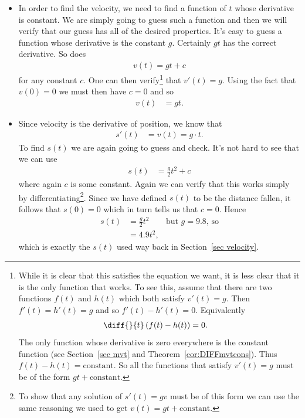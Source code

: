 \begin{eg}
\begin{itemize}
\item In order to find the velocity, we need to find a function of $t$ whose derivative
is constant. We are simply going to guess such a function and then we will verify that our
guess has all of the desired properties. It's easy to guess a function whose derivative is
the constant $g$.  Certainly $gt$ has the correct derivative. So does
\begin{align*}
    v(t) = gt + c
\end{align*}
for any constant $c$. One can then verify\footnote{While it is clear that this satisfies
the equation we want, it is less clear that it is the only function that
works. To see this, assume that there are two functions $f(t)$ and $h(t)$ which both
satisfy $v'(t)=g$. Then $f'(t)=h'(t) = g$ and so $f'(t)-h'(t) = 0$. Equivalently
\begin{align*}
  \diff{}{t}\left( f(t)-h(t) \right) &= 0.
\end{align*}
The only function whose derivative is zero everywhere is the constant function (see
Section~\ref{sec mvt} and Theorem~\ref{cor:DIFFmvtcons}). Thus $f(t)-h(t) =
\text{constant}$. So all the functions that satisfy $v'(t)=g$ must be of the form $gt +
\text{constant}$.
} that $v'(t)=g$. Using the fact that $v(0)=0$ we must then have $c=0$ and so
\begin{align*}
  v(t) &= gt.
\end{align*}

\item Since velocity is the derivative of position, we know that
\begin{align*}
  s'(t) &= v(t) = g \cdot t.
\end{align*}
To find $s(t)$ we are again going to guess and check. It's not hard to see that we can use
\begin{align*}
  s(t) &= \frac{g}{2} t^2 + c
\end{align*}
where again $c$ is some constant. Again we can verify that this works
simply by differentiating\footnote{To show that any solution of $s'(t)=gv$
must be of this form we can use the same reasoning we used to get $v(t) = gt +
\text{constant}$.}. Since we have defined $s(t)$ to be the distance fallen, it follows
that $s(0)=0$ which in turn tells us that $c = 0$. Hence
\begin{align*}
  s(t) &= \frac{g}{2} t^2 & \text{but $g=9.8$, so}\\
  &= 4.9 t^2,
\end{align*}
which is exactly the $s(t)$ used way back in Section~\ref{sec velocity}.
\end{itemize}


\end{eg}

